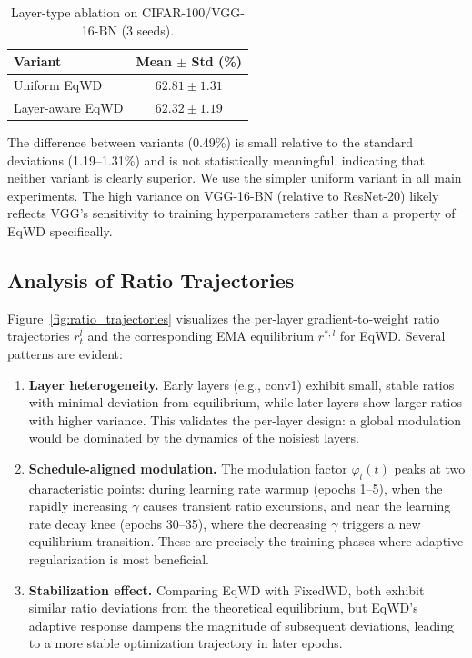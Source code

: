 \documentclass{article}
\begin{document}
\begin{table}[t]
\centering
\caption{Layer-type ablation on CIFAR-100/VGG-16-BN (3 seeds).}
\label{tab:ablation_layertype}
\small
\begin{tabular}{lc}
\toprule
Variant & Mean $\pm$ Std (\%) \\
\midrule
Uniform EqWD & $62.81 \pm 1.31$ \\
Layer-aware EqWD & $62.32 \pm 1.19$ \\
\bottomrule
\end{tabular}
\end{table}

The difference between variants (0.49\%) is small relative to the
standard deviations (1.19--1.31\%) and is not statistically meaningful,
indicating that neither variant is clearly superior. We use the simpler
uniform variant in all main experiments. The high variance on VGG-16-BN
(relative to ResNet-20) likely reflects VGG's sensitivity to training
hyperparameters rather than a property of EqWD specifically.


\subsection{Analysis of Ratio Trajectories}
\label{sec:ratio_analysis}

Figure~\ref{fig:ratio_trajectories} visualizes the
per-layer gradient-to-weight ratio trajectories $r_t^l$ and the
corresponding EMA equilibrium $r^{*,l}$ for EqWD. Several patterns are evident:

\begin{enumerate}
\item
  \textbf{Layer heterogeneity.} Early layers (e.g., conv1) exhibit
  small, stable ratios with minimal deviation from equilibrium, while
  later layers show larger ratios with higher variance. This validates
  the per-layer design: a global modulation would be dominated by the
  dynamics of the noisiest layers.
\item
  \textbf{Schedule-aligned modulation.} The modulation factor
  $\varphi_l(t)$ peaks at two characteristic points: during learning
  rate warmup (epochs 1--5), when the rapidly increasing $\gamma$
  causes transient ratio excursions, and near the learning rate decay knee
  (epochs 30--35), where the decreasing $\gamma$ triggers a new
  equilibrium transition. These are precisely the training phases where
  adaptive regularization is most beneficial.
\item
  \textbf{Stabilization effect.} Comparing EqWD with FixedWD, both
  exhibit similar ratio deviations from the theoretical equilibrium, but
  EqWD's adaptive response dampens the magnitude of subsequent
  deviations, leading to a more stable optimization trajectory in later
  epochs.
\end{enumerate}
\end{document}
